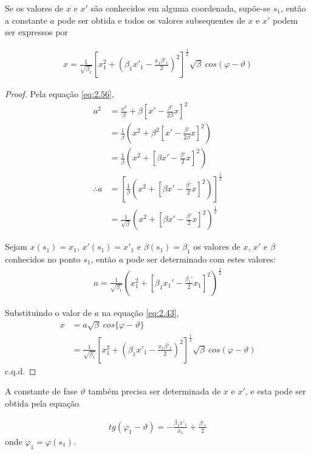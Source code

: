 Se os valores de $x$ e $x'$ são conhecidos em alguma coordenada, supõe-se $s_1$, então a constante $a$ pode ser obtida e todos os valores subsequentes de $x$ e $x'$ podem ser expressos por
	
\begin{align}
	x = \frac{1}{\sqrt{\beta_1}}\left[x_1^2+\left(\beta_1x'_1-\frac{x_1\beta'_1}{2}\right)^2\right]^\frac{1}{2}\sqrt{\beta}\ cos(\varphi-\vartheta)\label{eq:2.57}
\end{align}
	
\begin{proof}
	Pela equação \eqref{eq:2.56},
	\begin{align*}
        a^2 &= \frac{x^2}{\beta} + \beta\left[x'-\frac{\beta'}{2\beta}x\right]^2\\
        	&= \frac{1}{\beta}\left(x^2 + \beta^2\left[x'-\frac{\beta'}{2\beta}x\right]^2\right)\\
        	&= \frac{1}{\beta}\left(x^2 + \left[\beta x'-\frac{\beta'}{2}x\right]^2\right)\\
        \therefore a &= \left[\frac{1}{\beta}\left(x^2 + \left[\beta x'-\frac{\beta'}{2}x\right]^2\right)\right]^\frac{1}{2}\\
        	&= \frac{1}{\sqrt{\beta}}\left(x^2 + \left[\beta x'-\frac{\beta'}{2}x\right]^2\right)^\frac{1}{2}
	\end{align*}
	
	Sejam $x(s_1)=x_1$, $x'(s_1)=x'_1$ e $\beta(s_1)=\beta_1$ os valores de $x$, $x'$ e $\beta$ conhecidos no ponto $s_1$, então $a$ pode ser determinado com estes valores:
	\begin{align*}
		a = \frac{1}{\sqrt{\beta_1}}\left(x_1^2 + \left[\beta_1 x_1'-\frac{\beta_1'}{2}x_1\right]^2\right)^\frac{1}{2}
	\end{align*}
	
	Substituindo o valor de $a$ na equação \eqref{eq:2.43},
	\begin{align*}
		x &= a\sqrt{\beta}\ cos\{\varphi-\vartheta\}\\
		  &= \frac{1}{\sqrt{\beta_1}}\left[x_1^2+\left(\beta_1x'_1-\frac{x_1\beta'_1}{2}\right)^2\right]^\frac{1}{2}\sqrt{\beta}\ cos(\varphi-\vartheta)
	\end{align*}
	c.q.d.
\end{proof}
	
A constante de fase $\vartheta$ também precisa ser determinada de $x$ e $x'$, e esta pode ser obtida pela equação
	
\begin{align}
	tg(\varphi_1 - \vartheta) = -\frac{\beta_1 x'_1}{x_1}+\frac{\beta'_1}{2}
\end{align}
onde $\varphi_1 = \varphi(s_1)$.
	
